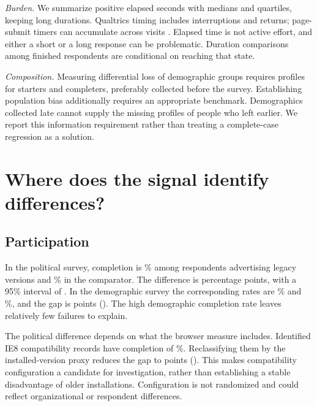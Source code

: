 \documentclass[11pt]{article}
\begin{document}
\emph{Burden.} We summarize positive elapsed seconds with medians and quartiles, keeping long durations. Qualtrics timing includes interruptions and returns; page-submit timers can accumulate across visits \citep{qualtricstiming}. Elapsed time is not active effort, and either a short or a long response can be problematic. Duration comparisons among finished respondents are conditional on reaching that state.

\emph{Composition.} Measuring differential loss of demographic groups requires profiles for starters and completers, preferably collected before the survey. Establishing population bias additionally requires an appropriate benchmark. Demographics collected late cannot supply the missing profiles of people who left earlier. We report this information requirement rather than treating a complete-case regression as a solution.

\section{Where does the signal identify differences?}

\subsection{Participation}

In the political survey, completion is \PolTokenOldRate\% among respondents advertising legacy versions and \PolTokenOtherRate\% in the comparator. The difference is \PolTokenGap{} percentage points, with a 95\% interval of \PolTokenCI{}. In the demographic survey the corresponding rates are \DemTokenOldRate\% and \DemTokenOtherRate\%, and the gap is \DemTokenGap{} points (\DemTokenCI{}). The high demographic completion rate leaves relatively few failures to explain.

The political difference depends on what the browser measure includes. Identified IE8 compatibility records have completion of \PolCompatibilityRate\%. Reclassifying them by the installed-version proxy reduces the gap to \PolInstalledGap{} points (\PolInstalledCI{}). This makes compatibility configuration a candidate for investigation, rather than establishing a stable disadvantage of older installations. Configuration is not randomized and could reflect organizational or respondent differences.
\end{document}
